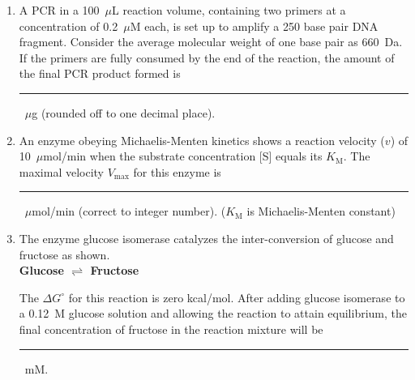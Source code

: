 \documentclass[journal,12pt,onecolumn]{IEEEtran}
\begin{document}
\begin{enumerate}[label=\arabic*.]
\item A PCR in a 100~$\mu$L reaction volume, containing two primers at a concentration of 0.2~$\mu$M each, is set up to amplify a 250 base pair DNA fragment. Consider the average molecular weight of one base pair as 660~Da. If the primers are fully consumed by the end of the reaction, the amount of the final PCR product formed is \rule{3cm}{0.1pt}~$\mu$g (rounded off to one decimal place).

\item An enzyme obeying Michaelis-Menten kinetics shows a reaction velocity ($v$) of 10~$\mu$mol/min when the substrate concentration [S] equals its $K_\text{M}$. The maximal velocity $V_\text{max}$ for this enzyme is \rule{3cm}{0.1pt}~$\mu$mol/min (correct to integer number). ($K_\text{M}$ is Michaelis-Menten constant)

\item The enzyme glucose isomerase catalyzes the inter-conversion of glucose and fructose as shown.\\[0.2cm]
\textbf{Glucose $\rightleftharpoons$ Fructose}

The $\Delta G^\circ$ for this reaction is zero kcal/mol. After adding glucose isomerase to a 0.12~M glucose solution and allowing the reaction to attain equilibrium, the final concentration of fructose in the reaction mixture will be \rule{3cm}{0.1pt}~mM.


\end{enumerate}
\newpage
\end{document}
